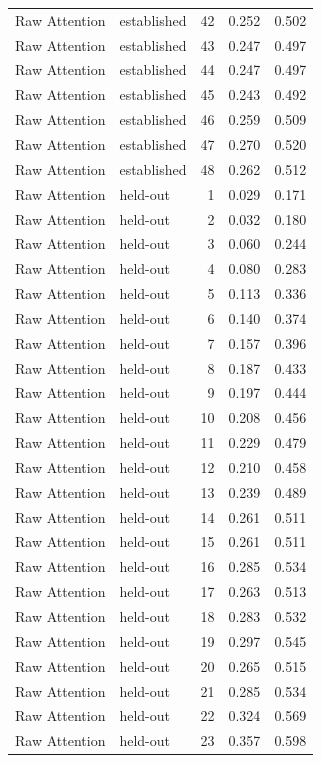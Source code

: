 \begin{tabular}{llrrr}
Raw Attention & established & 42 & 0.252 & 0.502 \\
Raw Attention & established & 43 & 0.247 & 0.497 \\
Raw Attention & established & 44 & 0.247 & 0.497 \\
Raw Attention & established & 45 & 0.243 & 0.492 \\
Raw Attention & established & 46 & 0.259 & 0.509 \\
Raw Attention & established & 47 & 0.270 & 0.520 \\
Raw Attention & established & 48 & 0.262 & 0.512 \\
Raw Attention & held-out & 1 & 0.029 & 0.171 \\
Raw Attention & held-out & 2 & 0.032 & 0.180 \\
Raw Attention & held-out & 3 & 0.060 & 0.244 \\
Raw Attention & held-out & 4 & 0.080 & 0.283 \\
Raw Attention & held-out & 5 & 0.113 & 0.336 \\
Raw Attention & held-out & 6 & 0.140 & 0.374 \\
Raw Attention & held-out & 7 & 0.157 & 0.396 \\
Raw Attention & held-out & 8 & 0.187 & 0.433 \\
Raw Attention & held-out & 9 & 0.197 & 0.444 \\
Raw Attention & held-out & 10 & 0.208 & 0.456 \\
Raw Attention & held-out & 11 & 0.229 & 0.479 \\
Raw Attention & held-out & 12 & 0.210 & 0.458 \\
Raw Attention & held-out & 13 & 0.239 & 0.489 \\
Raw Attention & held-out & 14 & 0.261 & 0.511 \\
Raw Attention & held-out & 15 & 0.261 & 0.511 \\
Raw Attention & held-out & 16 & 0.285 & 0.534 \\
Raw Attention & held-out & 17 & 0.263 & 0.513 \\
Raw Attention & held-out & 18 & 0.283 & 0.532 \\
Raw Attention & held-out & 19 & 0.297 & 0.545 \\
Raw Attention & held-out & 20 & 0.265 & 0.515 \\
Raw Attention & held-out & 21 & 0.285 & 0.534 \\
Raw Attention & held-out & 22 & 0.324 & 0.569 \\
Raw Attention & held-out & 23 & 0.357 & 0.598 \\

\end{tabular}
